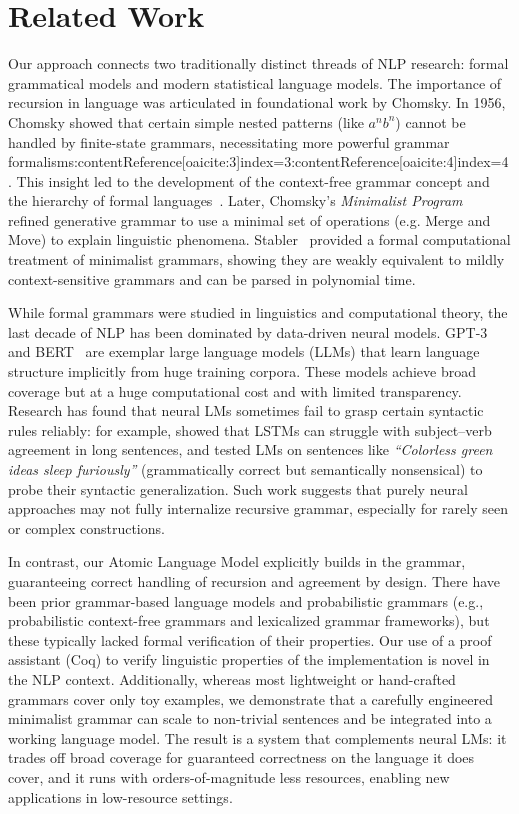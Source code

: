 \documentclass[11pt]{article}
\begin{document}
\section{Related Work}
Our approach connects two traditionally distinct threads of NLP research: formal grammatical models and modern statistical language models. The importance of recursion in language was articulated in foundational work by Chomsky. In 1956, Chomsky showed that certain simple nested patterns (like $a^n b^n$) cannot be handled by finite-state grammars, necessitating more powerful grammar formalisms:contentReference[oaicite:3]{index=3}:contentReference[oaicite:4]{index=4}. This insight led to the development of the context-free grammar concept and the hierarchy of formal languages~\cite{chomsky1956}. Later, Chomsky's \emph{Minimalist Program}~\cite{chomsky1995} refined generative grammar to use a minimal set of operations (e.g. Merge and Move) to explain linguistic phenomena. Stabler~\cite{stabler1997} provided a formal computational treatment of minimalist grammars, showing they are weakly equivalent to mildly context-sensitive grammars and can be parsed in polynomial time.

While formal grammars were studied in linguistics and computational theory, the last decade of NLP has been dominated by data-driven neural models. GPT-3~\cite{brown2020} and BERT~\cite{devlin2019} are exemplar large language models (LLMs) that learn language structure implicitly from huge training corpora. These models achieve broad coverage but at a huge computational cost and with limited transparency. Research has found that neural LMs sometimes fail to grasp certain syntactic rules reliably: for example, \citet{linzen2016} showed that LSTMs can struggle with subject–verb agreement in long sentences, and \citet{gulordava2018} tested LMs on sentences like \textit{\textquotedblleft Colorless green ideas sleep furiously\textquotedblright} (grammatically correct but semantically nonsensical) to probe their syntactic generalization. Such work suggests that purely neural approaches may not fully internalize recursive grammar, especially for rarely seen or complex constructions.

In contrast, our Atomic Language Model explicitly builds in the grammar, guaranteeing correct handling of recursion and agreement by design. There have been prior grammar-based language models and probabilistic grammars (e.g., probabilistic context-free grammars and lexicalized grammar frameworks), but these typically lacked formal verification of their properties. Our use of a proof assistant (Coq) to verify linguistic properties of the implementation is novel in the NLP context. Additionally, whereas most lightweight or hand-crafted grammars cover only toy examples, we demonstrate that a carefully engineered minimalist grammar can scale to non-trivial sentences and be integrated into a working language model. The result is a system that complements neural LMs: it trades off broad coverage for guaranteed correctness on the language it does cover, and it runs with orders-of-magnitude less resources, enabling new applications in low-resource settings.
\end{document}

